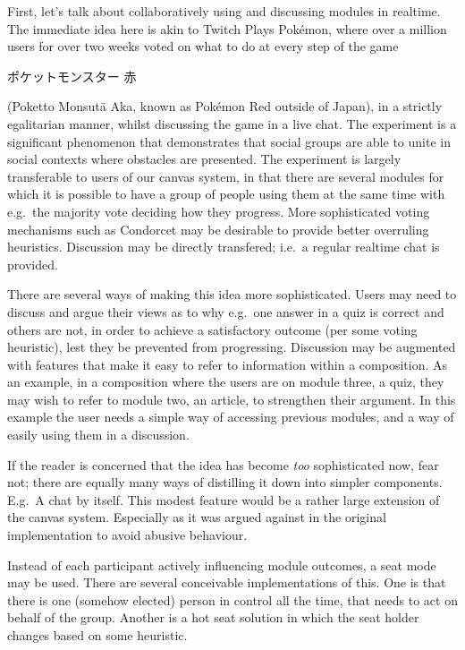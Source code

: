 \documentclass{article}
\begin{document}
\begin{multicols}{2}
First, let's talk about collaboratively using and discussing modules in 
realtime. The immediate idea here is akin to Twitch Plays Pokémon, where over 
a million users for over two weeks voted on what to do at every step of the 
game \begin{CJK}{UTF8}{min}ポケットモンスター 赤\end{CJK} (Poketto Monsut\={a} 
Aka, known as Pokémon Red outside of Japan), in a strictly egalitarian manner, 
whilst discussing the game in a live chat\cite{tpp}. The experiment is a 
significant phenomenon that demonstrates that social groups are able to unite 
in social contexts where obstacles are presented\cite{margeltwitch}. The 
experiment is largely transferable to users of our canvas system, in that 
there are several modules for which it is possible to have a group of people 
using them at the same time with e.g.\ the majority vote deciding how they 
progress. More sophisticated voting mechanisms such as Condorcet may be 
desirable to provide better overruling heuristics. Discussion may be directly 
transfered; i.e.\ a regular realtime chat is provided.

There are several ways of making this idea more sophisticated. Users may need 
to discuss and argue their views as to why e.g.\ one answer in a quiz is 
correct and others are not, in order to achieve a satisfactory outcome (per 
some voting heuristic), lest they be prevented from progressing. Discussion 
may be augmented with features that make it easy to refer to information 
within a composition. As an example, in a composition where the users are on 
module three, a quiz, they may wish to refer to module two, an article, to 
strengthen their argument. In this example the user needs a simple way of 
accessing previous modules, and a way of easily using them in a discussion.

If the reader is concerned that the idea has become \emph{too} sophisticated 
now, fear not; there are equally many ways of distilling it down into simpler 
components. E.g.\ A chat by itself. This modest feature would be a rather 
large extension of the canvas system. Especially as it was argued against in 
the original implementation to avoid abusive 
behaviour\cite{berntsen2015enabling}.

Instead of each participant actively influencing module outcomes, a seat mode 
may be used. There are several conceivable implementations of this. One is 
that there is one (somehow elected) person in control all the time, that needs 
to act on behalf of the group. Another is a hot seat solution in which the 
seat holder changes based on some heuristic.


\end{multicols}
\end{document}
